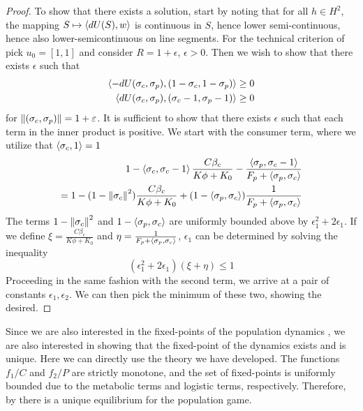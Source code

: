 \begin{proof}
  To show that there exists a solution, start by noting that for all $h\in H^2$, the mapping $S \mapsto \left \langle dU(S),w \right \rangle$ is continuous in $S$, hence lower semi-continuous, hence also lower-semicontinuous on line segments.
  For the technical criterion of  pick $u_0 = [1,1]$ and consider $R=1+\epsilon$, $\epsilon>0$. Then we wish to show that there exists $\epsilon$ such that
  \begin{equation}
    \begin{split}
    \left \langle -dU(\sigma_c,\sigma_p),(1-\sigma_c, 1-\sigma_p) \right \rangle \geq 0 \\
    \left \langle dU(\sigma_c,\sigma_p),(\sigma_c-1, \sigma_p-1) \right \rangle \geq 0
  \end{split}
  \end{equation}
  for $\left \Vert (\sigma_c,\sigma_p) \right \Vert = 1+\varepsilon$.
  It is sufficient to show that there exists $\epsilon$ such that each term in the inner product is positive. We start with the consumer term, where we utilize that $\left \langle \sigma_c,1 \right \rangle=1$
  \begin{equation}
    \begin{split}
    1-\ip{\sigma_c}{\sigma_c-1}\frac{ C \beta_c }{K\phi + K_0} - \frac{\ip{\sigma_p}{\sigma_c-1}}{F_p + \ip{\sigma_p}{\sigma_c}} \\
     =1-(1-\norm{\sigma_c}^2)\frac{ C \beta_c }{K\phi + K_0}+(1-\ip{\sigma_p}{\sigma_c})\frac{1}{F_p + \ip{\sigma_p}{\sigma_c}}
  \end{split}
  \end{equation}
  The terms $1-\left \Vert \sigma_c \right \Vert^2$ and $1-\left \langle \sigma_p,\sigma_c \right \rangle$ are uniformly bounded above by $\epsilon_1^2+2\epsilon_1$. If we define $\xi = \frac{C \beta_c }{K\phi + K_0}$ and $\eta = \frac{1}{F_p + \left \langle \sigma_p,\sigma_c \right \rangle}$, $\epsilon_1$ can be determined by solving the inequality
  \begin{equation}
    (\epsilon_1^2+2\epsilon_1)(\xi+\eta) \leq 1
  \end{equation}
  Proceeding in the same fashion with the second term, we arrive at a pair of constants $\epsilon_1,\epsilon_2$. We can then pick the minimum of these two, showing the desired.
\end{proof}
Since we are also interested in the fixed-points of the population dynamics , we are also interested in showing that the fixed-point of the dynamics exists and is unique. Here we can directly use the theory we have developed.  The functions $f_1/C$ and $f_2/P$ are strictly monotone, and the set of fixed-points is uniformly bounded due to the metabolic terms and logistic terms, respectively. Therefore, by  there is a unique equilibrium for the population game.
